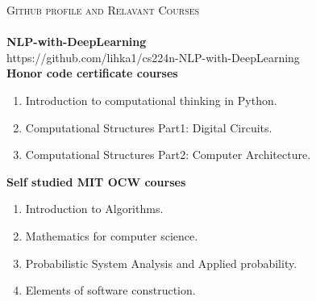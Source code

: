 \documentclass[a4paper]{article}
\newcommand{\lineunder} {
    \vspace*{-8pt} \\
    \hspace*{-18pt} \hrulefill \\
}
\newcommand{\header} [1] {
    {\hspace*{-18pt}\vspace*{6pt} \textsc{#1}}
    \vspace*{-6pt} \lineunder
}
\begin{document}
\header{Github profile and Relavant Courses} 
{\textbf{NLP-with-DeepLearning}}\\
https://github.com/lihka1/cs224n-NLP-with-DeepLearning\\
\vspace*{2mm}
{\textbf{Honor code certificate courses}}\\
\begin{enumerate}
  \item Introduction to computational thinking in Python.\\
  \item Computational Structures Part1: Digital Circuits.\\
  \item Computational Structures Part2: Computer Architecture.\\
\end{enumerate}
{\textbf{Self studied MIT OCW courses}}\\
\begin{enumerate}
  \item Introduction to Algorithms.\\
  \item Mathematics for computer science.\\
  \item Probabilistic System Analysis and Applied probability.\\
  \item Elements of software construction.\\
\end{enumerate}

\ 
\end{document}
